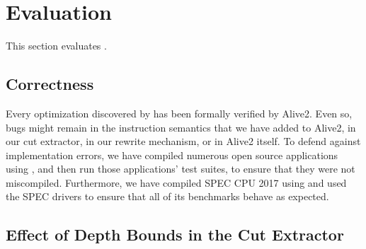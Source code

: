 \section{Evaluation}
\label{sec:evaluation}

This section evaluates \minotaur{}.


\subsection{Correctness}

Every optimization discovered by \minotaur{} has been formally verified by
Alive2.
%
Even so, bugs might remain in the instruction semantics that we have
added to Alive2, in our cut extractor, in our rewrite mechanism, or in
Alive2 itself.
%
To defend against implementation errors, we have compiled numerous
open source applications using \minotaur, and then run those applications'
test suites, to ensure that they were not miscompiled.
%
Furthermore, we have compiled SPEC CPU 2017 using \minotaur{} and
used the SPEC drivers to ensure that all of its benchmarks behave
as expected.


\subsection{Effect of Depth Bounds in the Cut Extractor}
\label{sec:loops}




